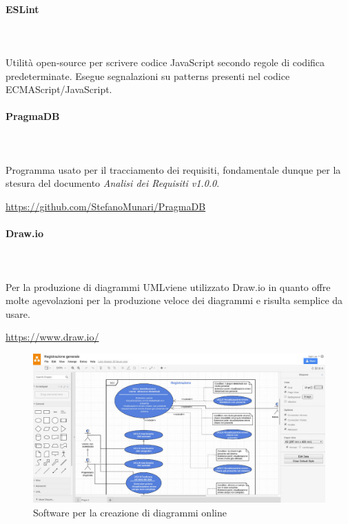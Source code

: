 \paragraph{ESLint} \mbox{}\\ \mbox{}\\
	Utilità open-source per scrivere codice JavaScript secondo regole di codifica 
predeterminate. Esegue segnalazioni su patterns presenti nel codice 
ECMAScript/JavaScript.
		
\paragraph{PragmaDB} \mbox{}\\ \mbox{}\\
Programma usato per il tracciamento dei requisiti, fondamentale dunque per la 
stesura del documento \textit{Analisi dei Requisiti v1.0.0}. \newline
\centerline{\url{https://github.com/StefanoMunari/PragmaDB}}
		
\paragraph{Draw.io} \mbox{}\\ \mbox{}\\
Per la produzione di diagrammi UML\glosp viene utilizzato Draw.io in quanto 
offre molte agevolazioni per la produzione veloce dei diagrammi e risulta 
semplice da usare. \newline
\centerline{\url{https://www.draw.io/}}
	\begin{figure}[H]
		\includegraphics[width=0.99\linewidth]{res/images/drawio.jpg}
		\caption{Software per la creazione di diagrammi online}
	\end{figure} 
		
